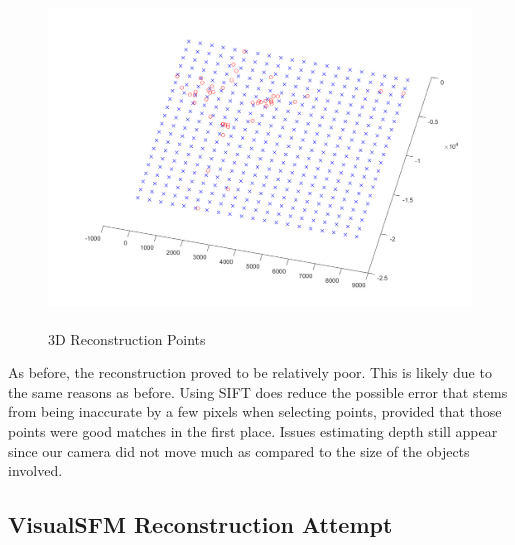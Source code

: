 \documentclass[11pt,psfig]{article}
\begin{document}
\begin{figure}[H]
\centering
\includegraphics[height=3.5in]{sfmResults1/triangulationAttemptSIFT4.png}
\caption{3D Reconstruction Points}
\end{figure}

As before, the reconstruction proved to be relatively poor. This is likely due to the same reasons as before. Using SIFT does reduce the possible error that stems from being inaccurate by a few pixels when selecting points, provided that those points were good matches in the first place. Issues estimating depth still appear since our camera did not move much as compared to the size of the objects involved.   

\newpage

\subsection{VisualSFM Reconstruction Attempt}
\end{document}
